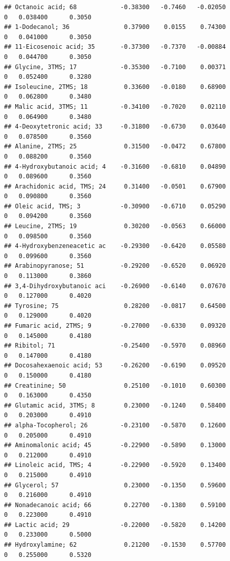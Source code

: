\documentclass[]{article}
\begin{document}
\begin{verbatim}
## Octanoic acid; 68            -0.38300   -0.7460   -0.02050         0   0.038400      0.3050
## 1-Dodecanol; 36               0.37900    0.0155    0.74300         0   0.041000      0.3050
## 11-Eicosenoic acid; 35       -0.37300   -0.7370   -0.00884         0   0.044700      0.3050
## Glycine, 3TMS; 17            -0.35300   -0.7100    0.00371         0   0.052400      0.3280
## Isoleucine, 2TMS; 18          0.33600   -0.0180    0.68900         0   0.062800      0.3480
## Malic acid, 3TMS; 11         -0.34100   -0.7020    0.02110         0   0.064900      0.3480
## 4-Deoxytetronic acid; 33     -0.31800   -0.6730    0.03640         0   0.078500      0.3560
## Alanine, 2TMS; 25             0.31500   -0.0472    0.67800         0   0.088200      0.3560
## 4-Hydroxybutanoic acid; 4    -0.31600   -0.6810    0.04890         0   0.089600      0.3560
## Arachidonic acid, TMS; 24     0.31400   -0.0501    0.67900         0   0.090800      0.3560
## Oleic acid, TMS; 3           -0.30900   -0.6710    0.05290         0   0.094200      0.3560
## Leucine, 2TMS; 19             0.30200   -0.0563    0.66000         0   0.098500      0.3560
## 4-Hydroxybenzeneacetic ac    -0.29300   -0.6420    0.05580         0   0.099600      0.3560
## Arabinopyranose; 51          -0.29200   -0.6520    0.06920         0   0.113000      0.3860
## 3,4-Dihydroxybutanoic aci    -0.26900   -0.6140    0.07670         0   0.127000      0.4020
## Tyrosine; 75                  0.28200   -0.0817    0.64500         0   0.129000      0.4020
## Fumaric acid, 2TMS; 9        -0.27000   -0.6330    0.09320         0   0.145000      0.4180
## Ribitol; 71                  -0.25400   -0.5970    0.08960         0   0.147000      0.4180
## Docosahexaenoic acid; 53     -0.26200   -0.6190    0.09520         0   0.150000      0.4180
## Creatinine; 50                0.25100   -0.1010    0.60300         0   0.163000      0.4350
## Glutamic acid, 3TMS; 8        0.23000   -0.1240    0.58400         0   0.203000      0.4910
## alpha-Tocopherol; 26         -0.23100   -0.5870    0.12600         0   0.205000      0.4910
## Aminomalonic acid; 45        -0.22900   -0.5890    0.13000         0   0.212000      0.4910
## Linoleic acid, TMS; 4        -0.22900   -0.5920    0.13400         0   0.215000      0.4910
## Glycerol; 57                  0.23000   -0.1350    0.59600         0   0.216000      0.4910
## Nonadecanoic acid; 66         0.22700   -0.1380    0.59100         0   0.223000      0.4910
## Lactic acid; 29              -0.22000   -0.5820    0.14200         0   0.233000      0.5000
## Hydroxylamine; 62             0.21200   -0.1530    0.57700         0   0.255000      0.5320

\end{verbatim}
\end{document}
